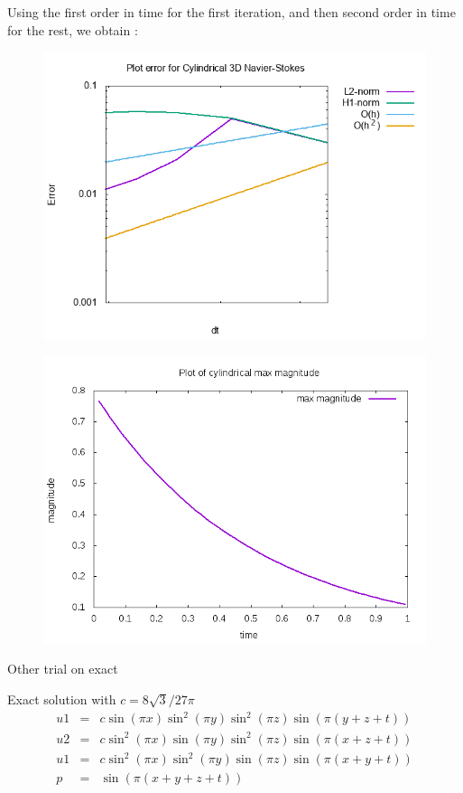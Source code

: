 \documentclass{beamer}
\begin{document}
\begin{frame}
Using the first order in time for the first iteration, and then second order in time for the rest, we obtain :
\begin{figure}
	\centering
	\includegraphics[width=0.8\linewidth]{NS_3D/error_cyl}
	\caption{}
	\label{fig:errorcyl}
\end{figure}
\end{frame}

\begin{frame}
\begin{figure}
	\centering
	\includegraphics[width=0.9\linewidth]{NS_3D/magnitude_cyl}
	\caption{}
	\label{fig:magnitudecyl}
\end{figure}
\end{frame}

\begin{frame}{Other trial on exact}
\begin{block}{Exact solution}
	with $ c = 8\sqrt{3}/27\pi $
	\begin{eqnarray}\nonumber
	u1 &=& c\sin(\pi x)\sin^2(\pi y)\sin^2(\pi z)\sin(\pi(y+z+t)) \\ \nonumber
	u2 &=& c\sin^2(\pi x)\sin(\pi y)\sin^2(\pi z)\sin(\pi(x+z+t)) \\ \nonumber
	u1 &=& c\sin^2(\pi x)\sin^2(\pi y)\sin(\pi z)\sin(\pi(x+y+t))\\ \nonumber
	p &=& \sin(\pi(x+y+z+t))
	\end{eqnarray}
\end{block}
\end{frame}
\end{document}
